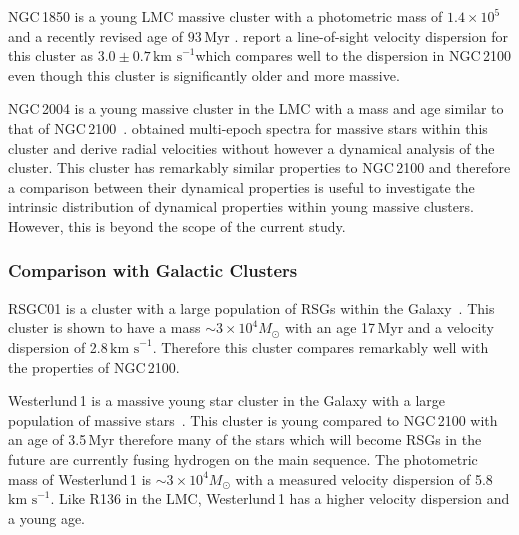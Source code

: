 \documentclass[useAMS,usenatbib]{mn2e}
\def\kms{$\mbox{km s}^{-1}$}
\begin{document}
NGC\,1850 is a young LMC massive cluster with a photometric mass of $1.4\times10^{5}$ and a recently revised age of $93\,$Myr
\citep{2015A&A...575A..62N}.
\citet{2005ApJS..161..304M} report a line-of-sight velocity dispersion for this cluster as $3.0\pm0.7\,$\kms which compares well to the dispersion in NGC\,2100 even though this cluster is significantly older and more massive.

NGC\,2004 is a young massive cluster in the LMC with a mass and age similar to that of NGC\,2100~\citep[20\,Myr; $2\times10^{4}M_{\odot}$][and references therein]{2015A&A...575A..62N}.
\citet{2006A&A...456..623E} obtained multi-epoch spectra for massive stars within this cluster and derive radial velocities without however a dynamical analysis of the cluster.
This cluster has remarkably similar properties to NGC\,2100 and therefore a comparison between their dynamical properties is useful to investigate the intrinsic distribution of dynamical properties within young massive clusters.
However, this is beyond the scope of the current study.


\subsubsection{Comparison with Galactic Clusters} %
\label{sub:galactic_clusters}

RSGC01 is a cluster with a large population of RSGs within the Galaxy~\citep{2007ApJ...671..781D}.
This cluster is shown to have a mass $\sim3\times10^{4}M_{\odot}$ with an age 17\,Myr and a velocity dispersion of 2.8\,\kms.
Therefore this cluster compares remarkably well with the properties of NGC\,2100.

Westerlund\,1 is a massive young star cluster in the Galaxy with a large population of massive stars~\citep{2005A&A...434..949C}.
This cluster is young compared to NGC\,2100 with an age of 3.5\,Myr therefore many of the stars which will become RSGs in the future are currently fusing hydrogen on the main sequence.
The photometric mass of Westerlund\,1 is $\sim3\times10^{4}M_{\odot}$ with a measured velocity dispersion of 5.8\,\kms.
Like R136 in the LMC, Westerlund\,1 has a higher velocity dispersion and a young age.



\end{document}
